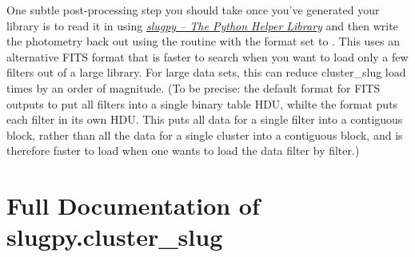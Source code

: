\documentclass[letterpaper,10pt,english]{sphinxmanual}
\begin{document}
One subtle post-processing step you should take once you've generated your library is to read it in using {\hyperref[slugpy:sec-slugpy]{\emph{slugpy -- The Python Helper Library}}} and then write the photometry back out using the  routine with the format set to . This uses an alternative FITS format that is faster to search when you want to load only a few filters out of a large library. For large data sets, this can reduce cluster\_slug load times by an order of magnitude. (To be precise: the default format for FITS outputs to put all filters into a single binary table HDU, whilte the  format puts each filter in its own HDU. This puts all data for a single filter into a contiguous block, rather than all the data for a single cluster into a contiguous block, and is therefore faster to load when one wants to load the data filter by filter.)


\section{Full Documentation of slugpy.cluster\_slug}
\label{cluster_slug:ssec-cluster-slug-full}\label{cluster_slug:full-documentation-of-slugpy-cluster-slug}
\end{document}
